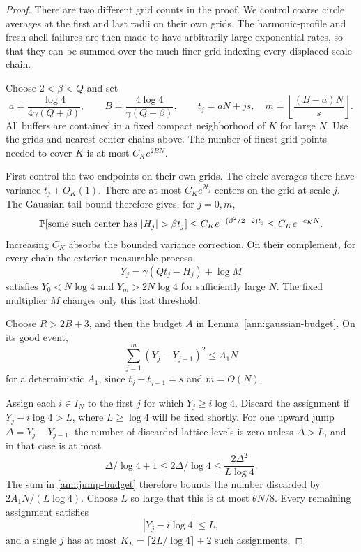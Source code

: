 \begin{proof}
There are two different grid counts in the proof. We control coarse
circle averages at the first and last radii on their own grids.
The harmonic-profile and fresh-shell failures are then made to have
arbitrarily large exponential rates, so that they can be summed over
the much finer grid indexing every displaced scale chain.

Choose \(2<\beta<Q\) and set
\[
 a=\frac{\log4}{4\gamma(Q+\beta)},\qquad
 B=\frac{4\log4}{\gamma(Q-\beta)},\qquad
 t_j=aN+js,\quad
 m=\left\lfloor\frac{(B-a)N}{s}\right\rfloor .
\]
All buffers are contained in a fixed compact neighborhood of \(K\)
for large \(N\).  Use the grids and nearest-center chains above.
The number of finest-grid points needed to cover \(K\) is at most
\(C_Ke^{2BN}\).

First control the two endpoints on their own grids.
The circle averages there have variance \(t_j+O_K(1)\).
There are at most \(C_Ke^{2t_j}\) centers on the grid at scale
\(j\).  The Gaussian tail bound therefore gives, for \(j=0,m\),
\begin{equation}
 \PP[\text{some such center has }|H_j|>\beta t_j]
 \le C_K e^{-(\beta^2/2-2)t_j}
 \le C_K e^{-c_KN}.
 \label{ann:endpoint-tail}
\end{equation}
Increasing \(C_K\) absorbs the bounded variance correction.
On their complement, for every chain the exterior-measurable
process
\[
 Y_j=\gamma(Qt_j-H_j)+\log M
\]
satisfies \(Y_0<N\log4\) and \(Y_m>2N\log4\) for sufficiently
large \(N\).  The fixed multiplier \(M\) changes only this last
threshold.

Choose \(R>2B+3\), and then the budget \(A\) in
Lemma~\ref{ann:gaussian-budget}.  On its good event,
\begin{equation}
 \sum_{j=1}^m(Y_j-Y_{j-1})^2\le A_1N
 \label{ann:jump-budget}
\end{equation}
for a deterministic \(A_1\), since \(t_j-t_{j-1}=s\)
and \(m=O(N)\).

Assign each \(i\in I_N\) to the first \(j\) for which
\(Y_j\ge i\log4\).  Discard the assignment if
\(Y_j-i\log4>L\), where \(L\ge\log4\) will be fixed shortly.
For one upward jump \(\Delta=Y_j-Y_{j-1}\), the number of
discarded lattice levels is zero unless \(\Delta>L\), and in
that case is at most
\[
 \Delta/\log4+1\le 2\Delta/\log4
                 \le\frac{2\Delta^2}{L\log4}.
\]
The sum in \eqref{ann:jump-budget} therefore bounds the number
discarded by \(2A_1N/(L\log4)\).  Choose \(L\) so large
that this is at most \(\theta N/8\).
Every remaining assignment satisfies
\begin{equation}
 |Y_j-i\log4|\le L,
 \label{ann:alignment}
\end{equation}
and a single \(j\) has at most
\(K_L=\lceil2L/\log4\rceil+2\) such assignments.


\end{proof}
